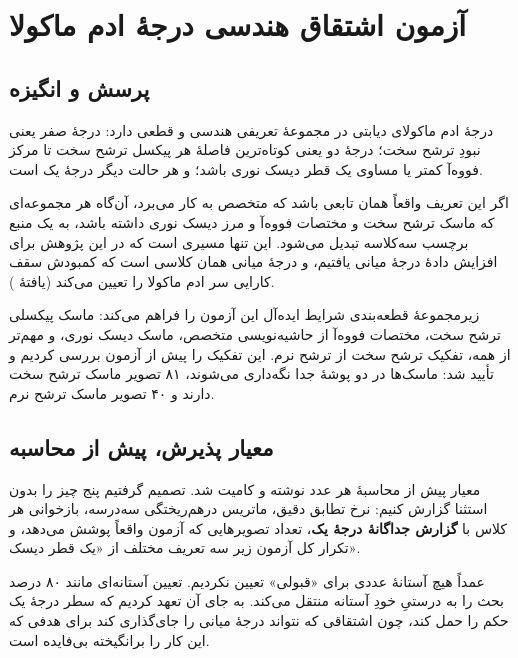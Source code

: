 
\chapter{آزمون اشتقاق هندسی درجهٔ ادم ماکولا}
\label{sec:parta}

\section{پرسش و انگیزه}

درجهٔ ادم ماکولای دیابتی در مجموعهٔ  تعریفی هندسی و قطعی دارد: درجهٔ صفر یعنی نبودِ
ترشح سخت؛ درجهٔ دو یعنی کوتاه‌ترین فاصلهٔ هر پیکسل ترشح سخت تا مرکز فووه‌آ کمتر یا مساوی یک قطر
دیسک نوری باشد؛ و هر حالت دیگر درجهٔ یک است.

اگر این تعریف واقعاً همان تابعی باشد که متخصص به کار می‌برد، آن‌گاه هر مجموعه‌ای که ماسک ترشح
سخت و مختصات فووه‌آ و مرز دیسک نوری داشته باشد، به یک منبع برچسب سه‌کلاسه تبدیل می‌شود. این
تنها مسیری است که در این پژوهش برای افزایش دادهٔ درجهٔ میانی یافتیم، و درجهٔ میانی همان کلاسی
است که کمبودش سقف کارایی سر ادم ماکولا را تعیین می‌کند (یافتهٔ ).

زیرمجموعهٔ قطعه‌بندی  شرایط ایده‌آل این آزمون را فراهم می‌کند: ماسک پیکسلی ترشح سخت،
مختصات فووه‌آ از حاشیه‌نویسی متخصص، ماسک دیسک نوری، و مهم‌تر از همه، تفکیک ترشح سخت از ترشح نرم.
این تفکیک را پیش از آزمون بررسی کردیم و تأیید شد: ماسک‌ها در دو پوشهٔ جدا نگه‌داری می‌شوند،
\num{۸۱} تصویر ماسک ترشح سخت دارند و \num{۴۰} تصویر ماسک ترشح نرم.

\section{معیار پذیرش، پیش از محاسبه}

معیار پیش از محاسبهٔ هر عدد نوشته و کامیت شد. تصمیم گرفتیم پنج چیز را بدون استثنا گزارش کنیم:
نرخ تطابق دقیق، ماتریس درهم‌ریختگی سه‌در‌سه، بازخوانی هر کلاس با \textbf{گزارش جداگانهٔ درجهٔ یک}،
تعداد تصویرهایی که آزمون واقعاً پوشش می‌دهد، و تکرار کل آزمون زیر سه تعریف مختلف از «یک قطر دیسک».

عمداً هیچ آستانهٔ عددی برای «قبولی» تعیین نکردیم. تعیین آستانه‌ای مانند \num{۸۰} درصد بحث را به
درستیِ خودِ آستانه منتقل می‌کند. به جای آن تعهد کردیم که سطر درجهٔ یک حکم را حمل کند، چون
اشتقاقی که نتواند درجهٔ میانی را جای‌گذاری کند برای هدفی که این کار را برانگیخته بی‌فایده است.

